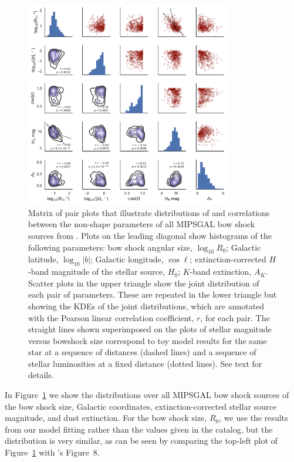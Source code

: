 \begin{figure}
  \centering
  \includegraphics[width=0.8\textwidth]{figs/mipsgal-pairplot}
  \caption[]{Matrix of pair plots that illustrate distributions of and
    correlations between the non-shape parameters of all MIPSGAL bow
    shock sources from \citet{Kobulnicky:2016a}.  Plots on the leading
    diagonal show histograms of the following parameters: bow shock
    angular size, \(\log_{10} R_0\); Galactic latitude,
    \(\log_{10}|b|\); Galactic longitude, \(\cos \ell\);
    extinction-corrected \(H\)-band magnitude of the stellar source,
    \(H_0\); \(K\)-band extinction, \(A_K\).  Scatter plots in the
    upper triangle show the joint distribution of each pair of
    parameters.  These are repeated in the lower triangle but showing
    the KDEs of the joint distributions, which are annotated with the
    Pearson linear correlation coefficient, \(r\), for each pair. The
    straight lines shown superimposed on the plots of stellar magnitude
    versus bowshock size correspond to toy model results for the same star
    at a sequence of distances (dashed lines) and a sequence of
    stellar luminosities at a fixed distance (dotted lines).  See text
    for details. }
  \label{fig:mipsgal-pairplot}
\end{figure}

In Figure~\ref{fig:mipsgal-pairplot} we show the distributions over
all MIPSGAL bow shock sources of the bow shock size, Galactic
coordinates, extinction-corrected stellar source magnitude, and dust
extinction.  For the bow shock size, \(R_0\), we use the results from
our model fitting rather than the values given in the
\citet{Kobulnicky:2016a} catalog, but the distribution is very
similar, as can be seen by comparing the top-left plot of
Figure~\ref{fig:mipsgal-pairplot} with \citeauthor{Kobulnicky:2016a}'s
Figure~8.

